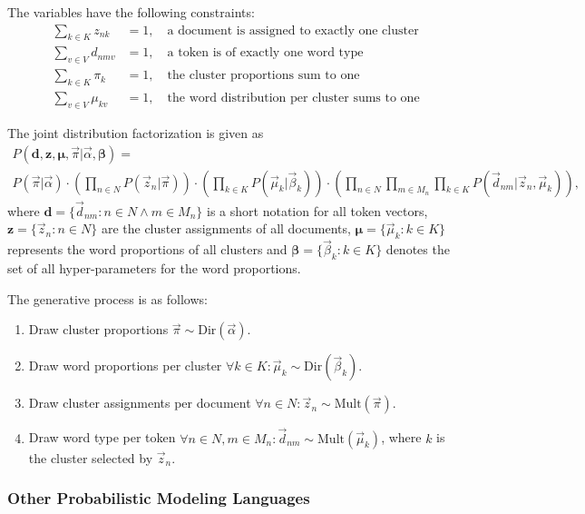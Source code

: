 \begin{Example}
The variables have the following constraints:
\begin{align}
\sum_{k \in K} z_{nk} &= 1,\quad \text{a document is assigned to exactly one cluster}\\
\sum_{v \in V} d_{nmv} &= 1,\quad \text{a token is of exactly one word type}\\
\sum_{k \in K} \pi_{k} &= 1,\quad \text{the cluster proportions sum to one}\\
\sum_{v \in V} \mu_{kv} &= 1,\quad \text{the word distribution per cluster sums to one}
\end{align}

The joint distribution factorization is given as
\begin{multline}
P(\boldsymbol{d},\boldsymbol{z}, \boldsymbol{\mu}, \vec \pi | \vec \alpha, \boldsymbol{\beta}) = \\
 P(\vec \pi | \vec \alpha) \cdot
 \left(\prod_{n \in N} P(\vec z_n | \vec \pi)\right) \cdot
 \left(\prod_{k \in K}P(\vec \mu_k | \vec \beta_k)\right) \cdot 
 \left(\prod_{n \in N} \prod_{m \in M_n} \prod_{k \in K}P(\vec d_{nm} | \vec z_n, \vec \mu_k)\right),
\end{multline}
where $\boldsymbol{d} = \{\vec d_{nm} : n \in N \land m \in M_n \}$ is a short notation for all token vectors, $\boldsymbol{z} = \{ \vec z_n : n \in N \}$ are the cluster assignments of all documents, $\boldsymbol{\mu} = \{ \vec \mu_k : k \in K \}$ represents the word proportions of all clusters and $\boldsymbol{\beta} = \{ \vec \beta_k : k \in K \}$ denotes the set of all hyper-parameters for the word proportions.

The generative process is as follows:
\begin{enumerate}
\item Draw cluster proportions $\vec \pi \sim \text{Dir}(\vec \alpha)$.
\item Draw word proportions per cluster $\forall k \in K: \vec \mu_k \sim \text{Dir}(\vec \beta_k)$.
\item Draw cluster assignments per document $\forall n \in N: \vec z_n \sim \text{Mult}(\vec \pi)$.
\item Draw word type per token $\forall n \in N, m \in M_n: \vec d_{nm} \sim \text{Mult}(\vec \mu_k)$, where $k$ is the cluster selected by $\vec z_n$.
\end{enumerate}

\end{Example}

\subsubsection{Other Probabilistic Modeling Languages}

